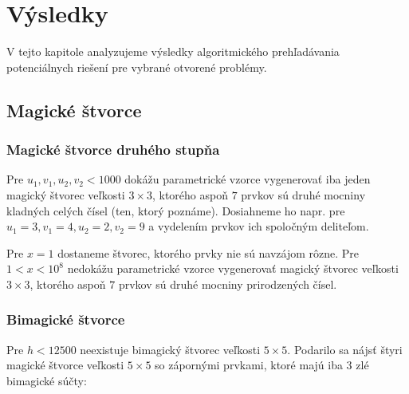 \chapter{Výsledky}

\label{kap:results} %

V tejto kapitole analyzujeme výsledky algoritmického prehľadávania potenciálnych riešení pre vybrané otvorené problémy. \\

\section{Magické štvorce}

\subsection{Magické štvorce druhého stupňa}

\begin{result} Pre $u_1, v_1, u_2, v_2 < 1000$ dokážu parametrické vzorce vygenerovať iba jeden magický štvorec veľkosti $3 \times 3$, ktorého aspoň $7$ prvkov sú druhé mocniny kladných celých čísel (ten, ktorý poznáme). Dosiahneme ho napr. pre $u_1 = 3, v_1 = 4, u_2 = 2, v_2 = 9$ a vydelením prvkov ich spoločným deliteľom.
\end{result}

\begin{result} Pre $x = 1$ dostaneme štvorec, ktorého prvky nie sú navzájom rôzne. Pre $1 < x < 10^8$ nedokážu parametrické vzorce vygenerovať magický štvorec veľkosti $3 \times 3$, ktorého aspoň $7$ prvkov sú druhé mocniny prirodzených čísel.
\end{result}

\subsection{Bimagické štvorce}

\begin{result} Pre $h < 12500$ neexistuje bimagický štvorec veľkosti $5 \times 5$. Podarilo sa nájsť štyri magické štvorce veľkosti $5 \times 5$ so zápornými prvkami, ktoré majú iba $3$ zlé bimagické súčty:
\end{result}

